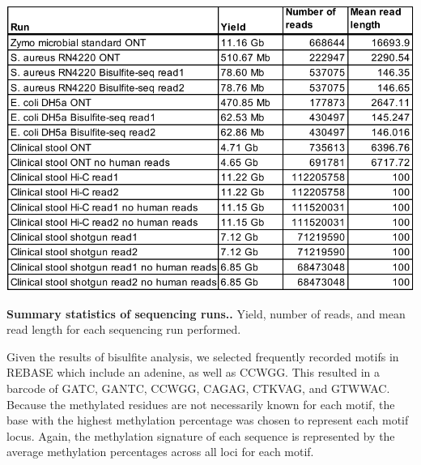 \begin{table}[!hb]
\centering
\includegraphics[width = 1\linewidth,keepaspectratio]{figure/yields.pdf}
\caption[ Summary statistics of sequencing runs.]{{\bf  Summary statistics of sequencing runs..} Yield, number of reads, and mean read length for each sequencing run performed. }
\label{tab:yields}
\end{table}


Given the results of bisulfite analysis, we selected frequently recorded motifs in REBASE which include an adenine, as well as CCWGG. This resulted in a barcode of GATC, GANTC, CCWGG, CAGAG, CTKVAG, and GTWWAC. Because the methylated residues are not necessarily known for each motif, the base with the highest methylation percentage was chosen to represent each motif  locus. Again, the methylation signature of each sequence is represented by the average methylation percentages across all loci for each motif.

